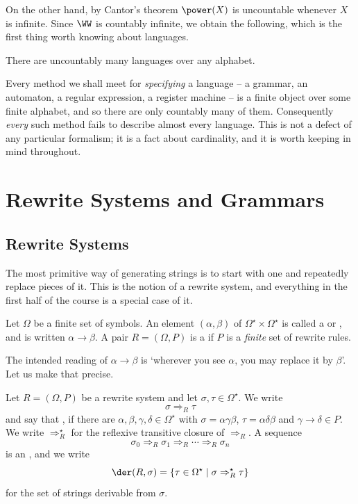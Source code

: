 On the other hand, by Cantor's theorem $\power(X)$ is uncountable whenever $X$ is infinite. Since $\WW$ is countably infinite, we obtain the following, which is the first thing worth knowing about languages.

\begin{corollary}\label{cor:uncountablymanylanguages}
	There are uncountably many languages over any alphabet.
\end{corollary}

Every method we shall meet for \emph{specifying} a language -- a grammar, an automaton, a regular expression, a register machine -- is a finite object over some finite alphabet, and so there are only countably many of them. Consequently \emph{every} such method fails to describe almost every language. This is not a defect of any particular formalism; it is a fact about cardinality, and it is worth keeping in mind throughout.

\section{Rewrite Systems and Grammars}

\subsection{Rewrite Systems}

The most primitive way of generating strings is to start with one and repeatedly replace pieces of it. This is the notion of a rewrite system, and everything in the first half of the course is a special case of it.

\begin{definition}
	Let $\Omega$ be a finite set of symbols. An element $(\alpha, \beta)$ of $\Omega^\star \times \Omega^\star$ is called a  or , and is written $\alpha \to \beta$. A pair $R = (\Omega, P)$ is a  if $P$ is a \emph{finite} set of rewrite rules.
\end{definition}

The intended reading of $\alpha \to \beta$ is `wherever you see $\alpha$, you may replace it by $\beta$'. Let us make that precise.

\begin{definition}[Derivation]
	Let $R = (\Omega, P)$ be a rewrite system and let $\sigma, \tau \in \Omega^\star$. We write
	$$\sigma \Rightarrow_R \tau$$
	and say that , if there are $\alpha, \beta, \gamma, \delta \in \Omega^\star$ with $\sigma = \alpha\gamma\beta$, $\tau = \alpha\delta\beta$ and $\gamma \to \delta \in P$. We write $\Rightarrow_R^\star$ for the reflexive transitive closure of $\Rightarrow_R$. A sequence
	$$\sigma_0 \Rightarrow_R \sigma_1 \Rightarrow_R \cdots \Rightarrow_R \sigma_n$$
	is an , and we write
	$$\der(R, \sigma) = \{\tau \in \Omega^\star \mid \sigma \Rightarrow_R^\star \tau\}$$
	for the set of strings derivable from $\sigma$.
\end{definition}

